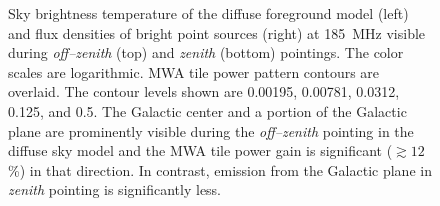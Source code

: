 \documentclass[preprint2,iop,numberedappendix,twocolappendix,appendixfloats]{emulateapj}
\begin{document}
\begin{figure}[htb]
\centering
\caption{Sky brightness temperature of the diffuse foreground model (left) and flux densities of bright point sources (right) at 185~MHz visible during {\it off--zenith} (top) and {\it zenith} (bottom) pointings. The color scales are logarithmic. MWA tile power pattern contours are overlaid. The contour levels shown are 0.00195, 0.00781, 0.0312, 0.125, and 0.5. The Galactic center and a portion of the Galactic plane are prominently visible during the {\it off--zenith} pointing in the diffuse sky model and the MWA tile power gain is significant ($\gtrsim 12$\%) in that direction. In contrast, emission from the Galactic plane in {\it zenith} pointing is significantly less.}
\label{fig:sky-model-MWA}
\end{figure}
\end{document}
